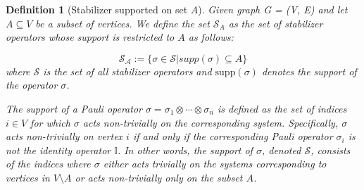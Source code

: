 \documentclass{article}
\newtheorem{definition}{Definition}
\begin{document}
\begin{definition} [Stabilizer supported on set $A$] \label{def:stabilizer_support}
Given graph G = (V, E) and let $ A \subseteq V $ be a subset of vertices. We define the set $ \mathcal{S}_A $ as the set of stabilizer operators whose support is restricted to $ A $ as follows:

\begin{equation}
\label{eq:stabilizer_support}
    \mathcal{S_A} := \{ \sigma \in \mathcal{S} | supp(\sigma) \subseteq A \}
\end{equation}
where $ \mathcal{S} $ is the set of all stabilizer operators and $ \text{supp}(\sigma) $ denotes the support of the operator $ \sigma $.

The support of a Pauli operator $ \sigma = \sigma_1 \otimes \cdots \otimes \sigma_n $ is defined as the set of indices $ i \in V $ for which $ \sigma $ acts non-trivially on the corresponding system. Specifically, $ \sigma $ acts non-trivially on vertex $ i $ if and only if the corresponding Pauli operator $ \sigma_i $ is not the identity operator $ \mathbb{I} $. In other words, the support of $ \sigma $, denoted $ \mathcal{S} $, consists of the indices where $ \sigma $ either acts trivially on the systems corresponding to vertices in $ V \setminus A $ or acts non-trivially only on the subset $ A $.
    
\end{definition}

\end{document}
